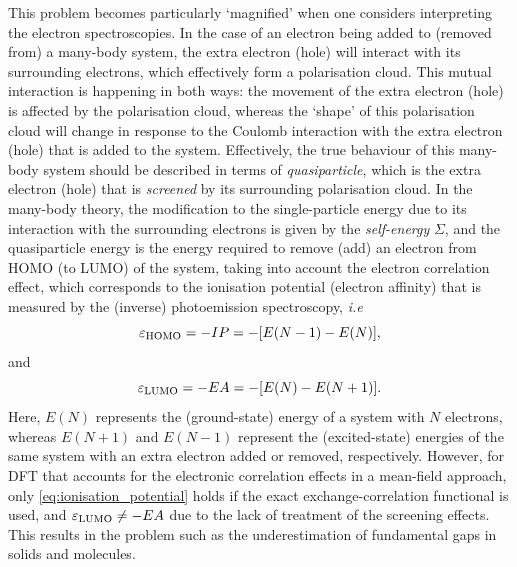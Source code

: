 This problem becomes particularly `magnified' when one considers interpreting the electron spectroscopies.\cite{golze2019gw} In the case of an electron being added to (removed from) a many-body system, the extra electron (hole) will interact with its surrounding electrons, which effectively form a polarisation cloud. This mutual interaction is happening in both ways: the movement of the  extra electron (hole)  is affected by the polarisation cloud, whereas the `shape' of this polarisation cloud will change in response to the Coulomb interaction with the  extra electron (hole)  that is added to the system. Effectively, the true behaviour of this many-body system should be described in terms of \textit{quasiparticle}, which is the extra electron (hole) that is \emph{screened} by its surrounding polarisation cloud. In the many-body theory, the modification to the single-particle energy due to its interaction with the surrounding electrons is given by the \textit{self-energy} $\Sigma$, and the quasiparticle energy is the energy required to remove (add) an electron from HOMO (to LUMO) of the  system, taking into account the electron correlation effect, which corresponds to the ionisation potential (electron affinity) that is measured by the (inverse) photoemission spectroscopy, \emph{i.e}
\begin{equation}
    \label{eq:ionisation_potential}
    \varepsilon_{\mbox{\scriptsize{HOMO}}}=-IP=-[E(N-1)-E(N)],
\end{equation}
and
\begin{equation}
    \label{eq:electron_affinity}
    \varepsilon_{\mbox{\scriptsize{LUMO}}}=-EA=-[E(N)-E(N+1)].
\end{equation}
Here, $E(N)$ represents the (ground-state) energy of a system with $N$ electrons, whereas $E(N+1)$ and $E(N-1)$ represent the (excited-state) energies of the same system with an extra electron added or removed, respectively. However, for DFT that accounts for the electronic correlation effects in a mean-field approach, only \cref{eq:ionisation_potential} holds if the exact exchange-correlation functional is used,\cite{kleinman1997significance} and $\varepsilon_{\mbox{\scriptsize{LUMO}}}\neq-EA$ due to the lack of treatment of the screening effects. This results in the problem such as the underestimation of fundamental gaps in solids and molecules.